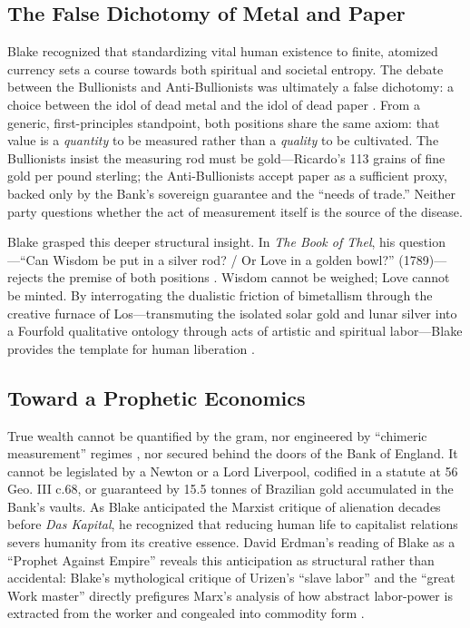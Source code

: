 \documentclass[
]{article}
\begin{document}
\subsection{The False Dichotomy of Metal and
Paper}\label{the-false-dichotomy-of-metal-and-paper}

Blake recognized that standardizing vital human existence to finite,
atomized currency sets a course towards both spiritual and societal
entropy. The debate between the Bullionists and Anti-Bullionists was
ultimately a false dichotomy: a choice between the idol of dead metal
and the idol of dead paper \citep{thornton1802nature, ricardo1810high}.
From a generic, first-principles standpoint, both positions share the
same axiom: that value is a \emph{quantity} to be measured rather than a
\emph{quality} to be cultivated. The Bullionists insist the measuring
rod must be gold---Ricardo's 113 grains of fine gold per pound sterling;
the Anti-Bullionists accept paper as a sufficient proxy, backed only by
the Bank's sovereign guarantee and the ``needs of trade.'' Neither party
questions whether the act of measurement itself is the source of the
disease.

Blake grasped this deeper structural insight. In \emph{The Book of
Thel}, his question---``Can Wisdom be put in a silver rod? / Or Love in
a golden bowl?'' (1789)---rejects the premise of both positions
\citep{blake1789thel}. Wisdom cannot be weighed; Love cannot be minted.
By interrogating the dualistic friction of bimetallism through the
creative furnace of Los---transmuting the isolated solar gold and lunar
silver into a Fourfold qualitative ontology through acts of artistic and
spiritual labor---Blake provides the template for human liberation
\citep{erdman1988complete, thompson1993witness}.

\subsection{Toward a Prophetic
Economics}\label{toward-a-prophetic-economics}

True wealth cannot be quantified by the gram, nor engineered by
``chimeric measurement'' regimes \citep{albernaz2024common}, nor secured
behind the doors of the Bank of England. It cannot be legislated by a
Newton or a Lord Liverpool, codified in a statute at 56 Geo. III c.68,
or guaranteed by 15.5 tonnes of Brazilian gold accumulated in the Bank's
vaults. As Blake anticipated the Marxist critique of alienation decades
before \emph{Das Kapital}, he recognized that reducing human life to
capitalist relations severs humanity from its creative essence. David
Erdman's reading of Blake as a ``Prophet Against Empire'' reveals this
anticipation as structural rather than accidental: Blake's mythological
critique of Urizen's ``slave labor'' and the ``great Work master''
directly prefigures Marx's analysis of how abstract labor-power is
extracted from the worker and congealed into commodity form
\citep{erdman1954prophet}.
\end{document}
